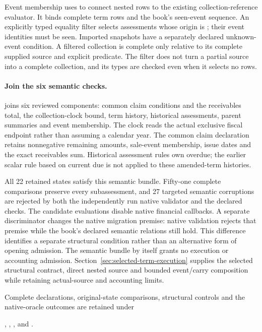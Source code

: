 Event membership uses  to connect nested
rows to the existing collection-reference evaluator. It binds complete term
rows and the book's
seen-event sequence. An explicitly typed equality filter selects assessments
whose origin is ; their event identities must be seen.
Imported snapshots have a separately declared unknown-event condition. A
filtered collection is complete only relative to its complete supplied source
and explicit predicate. The filter does not turn a partial source into a
complete collection, and its types are checked even when it selects no rows.

\paragraph{Join the six semantic checks.}
 joins six reviewed components: common claim
conditions and the receivables total, the collection-clock bound, term history,
historical assessments, parent summaries and event membership. The clock reads
the actual exclusive fiscal endpoint rather than assuming a calendar year.
The common claim declaration retains nonnegative remaining amounts, sale-event
membership, issue dates and the exact receivables sum. Historical assessment
rules own overdue; the earlier scalar rule based on current due is not applied
to these amended-term histories.

All 22 retained states satisfy this semantic bundle. Fifty-one complete
comparisons preserve every subassessment, and 27 targeted semantic corruptions
are rejected by both the independently run native validator and the declared
checks. The candidate evaluations disable native financial callbacks. A
separate discriminator changes the native migration premise: native validation
rejects that premise while the book's declared semantic relations still hold.
This difference identifies a separate structural condition rather than an
alternative form of opening admission. The semantic bundle by itself grants
no execution or accounting admission. Section~\ref{sec:selected-term-execution}
supplies the selected structural contract, direct nested source and bounded
event/carry composition while retaining actual-source and accounting limits.

Complete declarations, original-state comparisons, structural controls and
the native-oracle outcomes are retained under
\begingroup\raggedright
{},
,
,
and .
\par\endgroup
